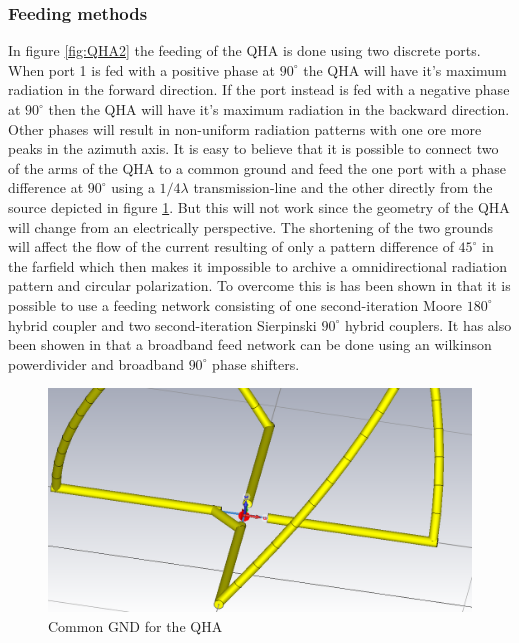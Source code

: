 \subsubsection{Feeding methods}
In figure \ref{fig:QHA2} the feeding of the QHA is done using two discrete ports. When port 1 is fed with a positive phase at $90^\circ$ the QHA will have it's maximum radiation in the forward direction. If the port instead is fed with a negative phase at $90^\circ$ then the QHA will have it's maximum radiation in the backward direction. Other phases will result in non-uniform radiation patterns with one ore more peaks in the azimuth axis. It is easy to believe that it is possible to connect two of the arms of the QHA to a common ground and feed the one port with a phase difference at $90^\circ$ using a $1/4 \lambda $ transmission-line and the other directly from the source depicted in figure \ref{fig:QHA_common}. But this will not work since the geometry of the QHA will change from an electrically perspective. The shortening of the two grounds will affect the flow of the current resulting of only a pattern difference of $45^\circ$ in the farfield which then makes it impossible to archive a omnidirectional radiation pattern and circular polarization. To overcome this is has been shown in \citep{Bai2014} that it is possible to use a feeding network consisting of one second-iteration Moore $180^\circ$ hybrid coupler and two second-iteration Sierpinski $90^\circ$ hybrid couplers. It has also been showen in \citep{Yang2014} that a broadband feed network can be done using an wilkinson powerdivider and broadband $90^\circ$ phase shifters.     

\begin{figure}[H]
\centering 
\includegraphics[scale = 0.3]{figures/antennas/qha/qha_6_common_gnd}
\caption{Common GND for the QHA}
\label{fig:QHA_common}
\end{figure}

